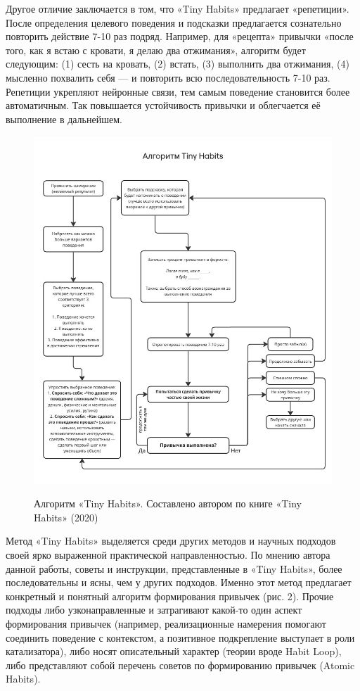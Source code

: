 \documentclass[pdflatex,sn-mathphys-num]{sn-jnl}%
\theoremstyle{thmstyleone}%
\theoremstyle{thmstyletwo}%
\theoremstyle{thmstylethree}%
\begin{document}
Другое отличие заключается в том, что «Tiny Habits» предлагает «репетиции». После определения целевого поведения и подсказки предлагается сознательно повторить действие 7-10 раз подряд. Например, для «рецепта» привычки «после того, как я встаю с кровати, я делаю два отжимания», алгоритм будет следующим: (1) сесть на кровать, (2) встать, (3) выполнить два отжимания, (4) мысленно похвалить себя — и повторить всю последовательность 7-10 раз. Репетиции укрепляют нейронные связи, тем самым поведение становится более автоматичным. Так повышается устойчивость привычки и облегчается её выполнение в дальнейшем.

\begin{figure}[h]
  \centering
  \includegraphics[width=\linewidth]{figures/tiny_habits_alg.jpg}
  \label{pic2}
  \caption{Алгоритм «Tiny Habits». Составлено автором по книге «Tiny Habits» (2020)}
\end{figure}

Метод «Tiny Habits» выделяется среди других методов и научных подходов своей ярко выраженной практической направленностью.  По мнению автора данной работы, советы и инструкции, представленные в «Tiny Habits», более последовательны и ясны, чем у других подходов. Именно этот метод предлагает конкретный и понятный алгоритм формирования привычек (рис. 2). Прочие подходы либо узконаправленные и затрагивают какой-то один аспект формирования привычек (например, реализационные намерения помогают соединить поведение с контекстом, а позитивное подкрепление выступает в роли катализатора), либо носят описательный характер (теории вроде Habit Loop), либо представляют собой перечень советов по формированию привычек (Atomic Habits).
\end{document}
